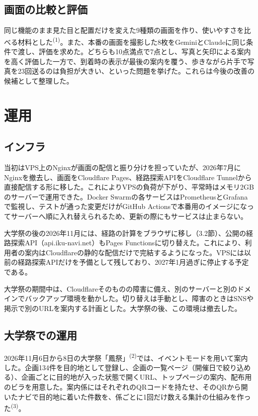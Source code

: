 \documentclass[
  paper=a4paper,
  fontsize=10.5pt,
  jafontsize=10.5pt,
  twocolumn,
  line_length=82.5mm,   %
  column_gap=5mm,
  gutter=20mm,          %
  number_of_lines=35,   %
  head_space=25mm,      %
  baselineskip=20.36pt, %
]{jlreq}
\newcommand{\chu}[1]{\textsuperscript{(#1)}}
\begin{document}
\subsection{画面の比較と評価}

同じ機能のまま見た目と配置だけを変えた9種類の画面を作り、使いやすさを比べる材料とした\chu{1}。また、本番の画面を撮影した8枚をGeminiとClaudeに同じ条件で渡し、評価を求めた。どちらも10点満点で7点とし、写真と矢印による案内を高く評価した一方で、到着時の表示が最後の案内を覆う、歩きながら片手で写真を23回送るのは負担が大きい、といった問題を挙げた。これらは今後の改善の候補として整理した。

\section{運用}

\subsection{インフラ}

当初はVPS上のNginxが画面の配信と振り分けを担っていたが、2026年7月にNginxを撤去し、画面をCloudflare Pages、経路探索APIをCloudflare Tunnelから直接配信する形に移した。これによりVPSの負荷が下がり、平常時はメモリ2GBのサーバーで運用できた。Docker Swarmの各サービスはPrometheusとGrafanaで監視し、テストが通った変更だけがGitHub Actionsで本番用のイメージになってサーバーへ順に入れ替えられるため、更新の際にもサービスは止まらない。

大学祭の後の2026年11月には、経路の計算をブラウザに移し（3.2節）、公開の経路探索API（api.iku-navi.net）もPages Functionsに切り替えた。これにより、利用者の案内はCloudflareの静的な配信だけで完結するようになった。VPSには以前の経路探索APIだけを予備として残しており、2027年1月過ぎに停止する予定である。

大学祭の期間中は、Cloudflareそのものの障害に備え、別のサーバーと別のドメインでバックアップ環境を動かした。切り替えは手動とし、障害のときはSNSや掲示で別のURLを案内する計画とした。大学祭の後、この環境は撤去した。

\subsection{大学祭での運用}

2026年11月6日から8日の大学祭「鳳祭」\chu{2}では、イベントモードを用いて案内した。企画134件を目的地として登録し、企画の一覧ページ（開催日で絞り込める）、企画ごとに目的地が入った状態で開くURL、トップページの案内、配布用のビラを用意した。案内係にはそれぞれのQRコードを持たせ、そのQRから開いたナビで目的地に着いた件数を、係ごとに1回だけ数える集計の仕組みを作った\chu{3}。
\end{document}
